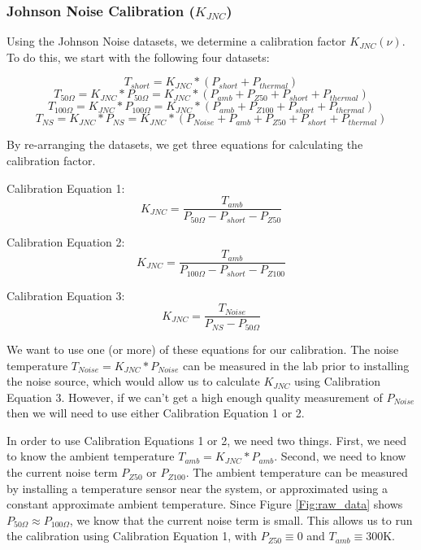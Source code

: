 \subsubsection{Johnson Noise Calibration ($K_{JNC}$)}

Using the Johnson Noise datasets, we determine a calibration factor $K_{JNC}(\nu)$. To do this, we start with the following four datasets:

\begin{equation}
T_{short} = K_{JNC}*(P_{short}+P_{thermal})
\end{equation}
\begin{equation}
T_{50 \Omega} = K_{JNC}*P_{50 \Omega} = K_{JNC}*(P_{amb} + P_{Z50} + P_{short}+P_{thermal})
\end{equation}
\begin{equation}
T_{100 \Omega} = K_{JNC}*P_{100 \Omega} = K_{JNC}*(P_{amb} + P_{Z100}+P_{short}+P_{thermal})
\end{equation}
\begin{equation}
T_{NS} = K_{JNC}*P_{NS} = K_{JNC}*(P_{Noise}+P_{amb}+P_{Z50}+P_{short}+P_{thermal})
\end{equation}

By re-arranging the datasets, we get three equations for calculating the calibration factor.

Calibration Equation 1:
\begin{equation}
K_{JNC} = \frac{T_{amb}}{P_{50 \Omega} - P_{short} - P_{Z50}}
\end{equation}

Calibration Equation 2:
\begin{equation}
K_{JNC} = \frac{T_{amb}}{P_{100 \Omega} - P_{short}-P_{Z100}}
\end{equation}

Calibration Equation  3:
\begin{equation}
K_{JNC} = \frac{T_{Noise}}{P_{NS}-P_{50 \Omega}}
\end{equation}

We want to use one (or more) of these equations for our calibration. The noise temperature $T_{Noise}= K_{JNC}*P_{Noise}$ can be measured in the lab prior to installing the noise source, which would allow us to calculate $K_{JNC}$ using Calibration Equation 3. However, if we can't get a high enough quality measurement of $P_{Noise}$ then we will need to use either Calibration Equation 1 or 2. 

In order to use Calibration Equations 1 or 2, we need two things. First, we need to know the ambient temperature $T_{amb} = K_{JNC}*P_{amb}$. Second, we need to know the current noise term $P_{Z50}$ or $P_{Z100}$. The ambient temperature can be measured by installing a temperature sensor near the system, or approximated using a constant approximate ambient temperature. Since Figure \ref{Fig:raw_data} shows $P_{50 \Omega} \approx P_{100 \Omega}$, we know that the current noise term is small. This allows us to run the calibration using Calibration Equation 1, with $P_{Z50} \equiv 0$ and $T_{amb} \equiv 300$K. 

